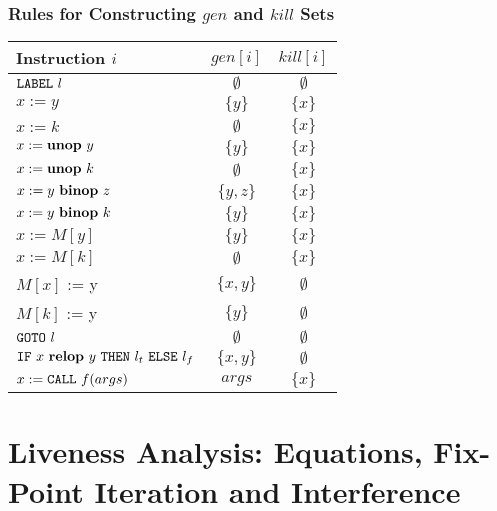 \documentclass{beamer}
\begin{document}
\begin{frame}
\frametitle{Rules for Constructing $gen$ and $kill$ Sets}

\renewcommand{\arraystretch}{0.9}
\begin{center}
\begin{tabular}{|l|c|c|} \hline
Instruction $i$ & $gen[i]$ & $kill[i]$ \\\hline\hline
${\tt LABEL}~l$ & $\emptyset$ & $\emptyset$ \\\hline
$x := y$ & $\{y\}$ & $\{x\}$ \\\hline
$x := k$ & $\emptyset$ & $\{x\}$ \\\hline
$x := {\bf unop}~y$ & $\{y\}$ & $\{x\}$ \\\hline
$x := {\bf unop}~k$ & $\emptyset$ & $\{x\}$ \\\hline
$x := y~{\bf binop}~z$ & $\{y,z\}$ & $\{x\}$ \\\hline
$x := y~{\bf binop}~k$ & $\{y\}$ & $\{x\}$ \\\hline
$x := M[y]$ & $\{y\}$ & $\{x\}$ \\\hline
$x := M[k]$ & $\emptyset$ & $\{x\}$ \\\hline
$M[x]$ := y& $\{x,y\}$ & $\emptyset$ \\\hline
$M[k]$ := y& $\{y\}$ & $\emptyset$ \\\hline
${\tt GOTO}~l$ & $\emptyset$ & $\emptyset$ \\\hline
${\tt IF}~x~{\bf relop}~y~{\tt THEN}~l_t~{\tt ELSE}~l_f$ & $\{x,y\}$ & $\emptyset$ \\\hline
$x := {\tt CALL}~f(args)$ & $args$ & $\{x\}$ \\\hline
\end{tabular}
\end{center}

\end{frame}

\section{Liveness Analysis: Equations, Fix-Point Iteration and Interference}

\begin{frame}[fragile]
	\tableofcontents[currentsection]
\end{frame}
\end{document}
